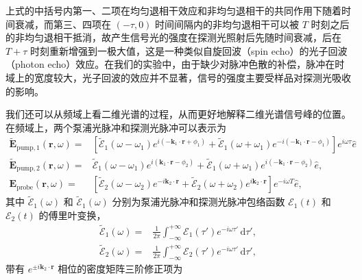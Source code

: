 \documentclass{thesis}
\begin{document}
上式的中括号内第一、二项在均匀退相干效应和非均匀退相干的共同作用下随着时间衰减，而第三、四项在 $(-\tau,0)$ 时间间隔内的非均匀退相干可以被 $T$ 时刻之后的非均匀退相干抵消，故产生信号光的强度在探测光照射后先随时间衰减，后在 $T+\tau$ 时刻重新增强到一极大值，这是一种类似自旋回波（spin echo）的光子回波（photon echo）效应。在我们的实验中，由于缺少对脉冲色散的补偿，脉冲在时域上的宽度较大，光子回波的效应并不显著，信号的强度主要受样品对探测光吸收的影响。

我们还可以从频域上看二维光谱的过程，从而更好地解释二维光谱信号峰的位置。在频域上，两个泵浦光脉冲和探测光脉冲可以表示为
\begin{align}
    \tilde{\bm{E}}_{\text{pump},1}(\bm{r},\omega)=&\left[\tilde{\mathcal{E}}_1(\omega-\omega_1)e^{i(-\bm{k}_1\cdot\bm{r}+\phi_1)}+\tilde{\mathcal{E}}_1(\omega+\omega_1)e^{-i(-\bm{k}_1\cdot\bm{r}-\phi_1)}\right]e^{i\omega\tau}\hat{e}\\
    \tilde{\bm{E}}_{\text{pump},2}(\bm{r},\omega)=&\tilde{\mathcal{E}}_1(\omega-\omega_1)e^{i(\bm{k}_1\cdot\bm{r}-\phi_2)}+\tilde{\mathcal{E}}_1(\omega+\omega_1)e^{i(-\bm{k}_1\cdot\bm{r}-\phi_2)}\hat{e},\\
    \bm{E}_{\text{probe}}(\bm{r},\omega)=&\left[\tilde{\mathcal{E}}_2(\omega-\omega_2)e^{-i\bm{k}_2\cdot\bm{r}}+\tilde{\mathcal{E}}_2(\omega+\omega_2)e^{i\bm{k}_2\cdot\bm{r}}\right]e^{-i\omega T}\hat{e},
\end{align}
其中 $\tilde{\mathcal{E}}_1(\omega)$ 和 $\tilde{\mathcal{E}}_1(\omega)$ 分别为泵浦光脉冲和探测光脉冲包络函数 $\mathcal{E}_1(t)$ 和 $\mathcal{E}_2(t)$ 的傅里叶变换，
\begin{align}
    \tilde{\mathcal{E}}_1(\omega)=&\frac{1}{2\pi}\int_{-\infty}^{+\infty}\mathcal{E}_1(\tau')e^{-i\omega\tau'}\,\mathrm{d}\tau',\\
    \tilde{\mathcal{E}}_2(\omega)=&\frac{1}{2\pi}\int_{-\infty}^{+\infty}\mathcal{E}_2(\tau')e^{-i\omega\tau'}\,\mathrm{d}\tau',
\end{align}
带有 $e^{\pm i\bm{k}_2\cdot\bm{r}}$ 相位的密度矩阵三阶修正项为
\end{document}

